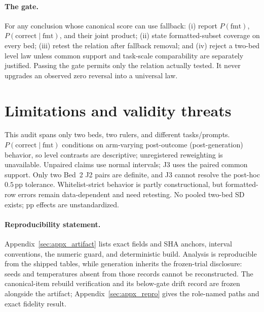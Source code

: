 \documentclass{article}
\newcommand{\Pfmt}{P(\mathrm{fmt})}
\newcommand{\PcFmt}{P(\mathrm{correct}\mid\mathrm{fmt})}
\newcommand{\pp}{\,\mathrm{pp}}
\begin{document}
\paragraph{The gate.}\label{sec:gate}
For any conclusion whose canonical score can use fallback: (i) report $\Pfmt$,
$\PcFmt$, and their joint product; (ii) state formatted-subset coverage on every
bed; (iii) retest the relation after fallback removal; and (iv) reject a
two-bed level law unless common support and task-scale comparability are
separately justified.
Passing the gate permits only the relation actually tested.  It never upgrades
an observed zero reversal into a universal law.

\section{Limitations and validity threats}
\label{sec:limitations}

This audit spans only two beds, two rulers, and different tasks/prompts.
$\PcFmt$ conditions on arm-varying post-outcome (post-generation) behavior, so level contrasts
are descriptive; unregistered reweighting is unavailable.  Unpaired claims
use normal intervals; J3 uses the paired common support.  Only two Bed~2 J2
pairs are definite, and J3 cannot resolve the post-hoc $0.5\pp$ tolerance.
Whitelist-strict behavior
is partly constructional, but formatted-row errors remain data-dependent and
need retesting.  No pooled two-bed SD exists; pp effects are unstandardized.

\paragraph{Reproducibility statement.}\label{sec:repro}
Appendix~\ref{sec:appx_artifact} lists exact fields and SHA anchors, interval
conventions, the
numeric guard, and deterministic build.  Analysis is reproducible from the
shipped tables, while generation inherits the frozen-trial disclosure: seeds
and temperatures absent from those records cannot be reconstructed.  The
canonical-item rebuild verification and its below-gate drift record are frozen
alongside the artifact; Appendix~\ref{sec:appx_repro} gives the role-named
paths and exact fidelity result.
\end{document}
